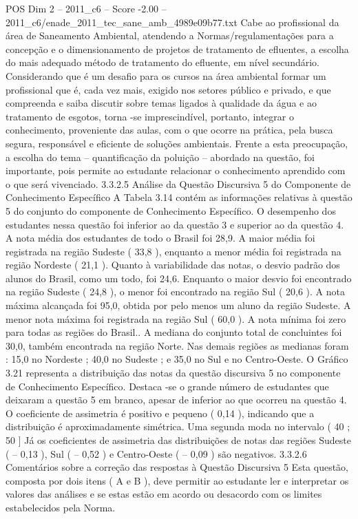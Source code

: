 \begin{textsample}{POS Dim 2 – 2011\_c6 – Score -2.00 – 2011\_c6/enade\_2011\_tec\_sane\_amb\_4989e09b77.txt}
Cabe ao profissional da área de Saneamento Ambiental, atendendo a Normas/regulamentações para a concepção e o dimensionamento de projetos de tratamento de efluentes, a escolha do mais adequado método de tratamento do efluente, em nível secundário.
Considerando que é um desafio para os cursos na área ambiental formar um profissional que é, cada vez mais, exigido nos setores público e privado, e que compreenda e saiba discutir sobre temas ligados à qualidade da água e ao tratamento de esgotos, torna -se imprescindível, portanto, integrar o conhecimento, proveniente das aulas, com o que ocorre na prática, pela busca segura, responsável e eficiente de soluções ambientais.
Frente a esta preocupação, a escolha do tema – quantificação da poluição – abordado na questão, foi importante, pois permite ao estudante relacionar o conhecimento aprendido com o que será vivenciado. 3.3.2.5 Análise da Questão Discursiva 5 do Componente de Conhecimento Específico A Tabela 3.14 contém as informações relativas à questão 5 do conjunto do componente de Conhecimento Específico.
O desempenho dos estudantes nessa questão foi inferior ao da questão 3 e superior ao da questão 4.
A nota média dos estudantes de todo o Brasil foi 28,9.
A maior média foi registrada na região Sudeste ( 33,8 ), enquanto a menor média foi registrada na região Nordeste ( 21,1 ).
Quanto à variabilidade das notas, o desvio padrão dos alunos do Brasil, como um todo, foi 24,6.
Enquanto o maior desvio foi encontrado na região Sudeste ( 24,8 ), o menor foi encontrado na região Sul ( 20,6 ).
A nota máxima alcançada foi 95,0, obtida por pelo menos um aluno da região Sudeste.
A menor nota máxima foi registrada na região Sul ( 60,0 ).
A nota mínima foi zero para todas as regiões do Brasil..
A mediana do conjunto total de concluintes foi 30,0, também encontrada na região Norte.
Nas demais regiões as medianas foram : 15,0 no Nordeste ; 40,0 no Sudeste ; e 35,0 no Sul e no Centro-Oeste.
O Gráfico 3.21 representa a distribuição das notas da questão discursiva 5 no componente de Conhecimento Específico.
Destaca -se o grande número de estudantes que deixaram a questão 5 em branco, apesar de inferior ao que ocorreu na questão 4.
O coeficiente de assimetria é positivo e pequeno ( 0,14 ), indicando que a distribuição é aproximadamente simétrica.
Uma segunda moda no intervalo ( 40 ; 50 ] Já os coeficientes de assimetria das distribuições de notas das regiões Sudeste ( – 0,13 ), Sul ( – 0,52 ) e Centro-Oeste ( – 0,09 ) são negativos. 3.3.2.6 Comentários sobre a correção das respostas à Questão Discursiva 5 Esta questão, composta por dois itens ( A e B ), deve permitir ao estudante ler e interpretar os valores das análises e se estas estão em acordo ou desacordo com os limites estabelecidos pela Norma.

\end{textsample}
